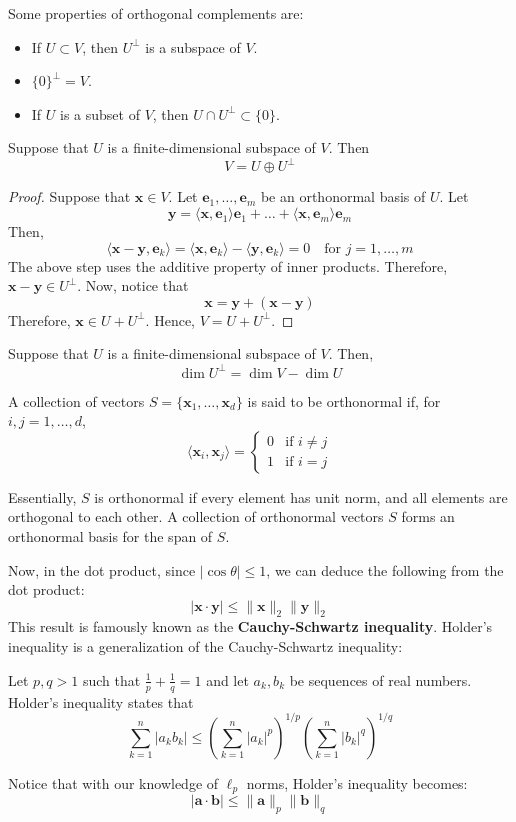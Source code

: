 \documentclass[12pt]{article}
\begin{document}
\noindent Some properties of orthogonal complements are:
\begin{itemize}
\item If $U\subset V$, then $U^\perp$ is a subspace of $V$.
\item $\{0\}^\perp = V$.
\item If $U$ is a subset of $V$, then $U\cap U^\perp\subset \{0\}$.
\end{itemize}
\begin{theorem}
Suppose that $U$ is a finite-dimensional subspace of $V$. Then $$V = U\oplus U^\perp$$
\begin{proof}
Suppose that $\mathbf{x}\in V$. Let $\mathbf{e}_1, \ldots, \mathbf{e}_m$ be an orthonormal basis of $U$. Let $$\mathbf{y}=\langle \mathbf{x}, \mathbf{e}_1 \rangle \mathbf{e}_1 +\ldots  + \langle \mathbf{x}, \mathbf{e}_m \rangle \mathbf{e}_m$$ Then, $$\langle \mathbf{x}-\mathbf{y}, \mathbf{e}_k\rangle = \langle \mathbf{x}, \mathbf{e}_k\rangle - \langle \mathbf{y}, \mathbf{e}_k\rangle = 0\quad\text{for }j=1,\ldots,m$$
The above step uses the additive property of inner products. Therefore, $\mathbf{x}-\mathbf{y}\in U^\perp$. Now, notice that $$\mathbf{x} = \mathbf{y} + (\mathbf{x}-\mathbf{y})$$Therefore, $\mathbf{x}\in U+U^\perp$. Hence, $V=U+U^\perp$.
\end{proof}
\end{theorem}
\begin{corollary}
Suppose that $U$ is a finite-dimensional subspace of $V$. Then, $$\dim U^\perp = \dim V - \dim U$$
\end{corollary}
\begin{definition}
A collection of vectors $S = \{\mathbf{x}_1,\ldots,\mathbf{x}_d\}$ is said to be orthonormal if, for $i,j=1,\ldots,d$, $$\langle \mathbf{x}_i,\mathbf{x}_j\rangle = \begin{cases}0 & \text{if } i\neq j\\ 1 & \text{if }i=j\end{cases}$$
\end{definition}

\noindent Essentially, $S$ is orthonormal if every element has unit norm, and all elements are orthogonal to each other. A collection of orthonormal vectors $S$ forms an orthonormal basis for the span of $S$.

\noindent Now, in the dot product, since $|\cos\theta|\leqslant 1$, we can deduce the following from the dot product:
$$|\mathbf{x}\cdot \mathbf{y}|\leqslant \|\mathbf{x}\|_2\|\mathbf{y}\|_2$$
This result is famously known as the \textbf{Cauchy-Schwartz inequality}. Holder's inequality is a generalization of the Cauchy-Schwartz inequality:
\begin{theorem}
Let $p,q>1$ such that $\frac{1}{p} + \frac{1}{q} = 1$ and let $a_k, b_k$ be sequences of real numbers. Holder's inequality states that $$\sum_{k=1}^n |a_kb_k|\leqslant \left(\sum_{k=1}^n|a_k|^p\right)^{1/p}\left(\sum_{k=1}^n|b_k|^q\right)^{1/q}$$
\end{theorem}
\noindent Notice that with our knowledge of $\ell_p$ norms, Holder's inequality becomes:
$$|\mathbf{a}\cdot \mathbf{b}|\leqslant \|\mathbf{a}\|_p\|\mathbf{b}\|_q$$
\end{document}
